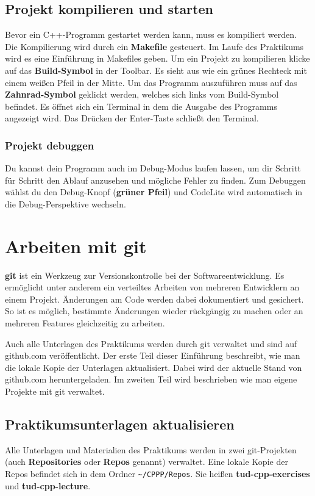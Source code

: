 \subsection{Projekt kompilieren und starten}
Bevor ein C++-Programm gestartet werden kann, muss es kompiliert werden.
Die Kompilierung wird durch ein \textbf{Makefile} gesteuert. Im Laufe des Praktikums wird es eine Einführung in Makefiles geben.
Um ein Projekt zu kompilieren klicke auf das \textbf{Build-Symbol} in der Toolbar. Es sieht aus wie ein grünes Rechteck mit einem weißen Pfeil in der Mitte.
Um das Programm auszuführen muss auf das \textbf{Zahnrad-Symbol} geklickt werden, welches sich links vom Build-Symbol befindet. Es öffnet sich ein Terminal in dem die Ausgabe des Programms angezeigt wird. Das Drücken der Enter-Taste schließt den Terminal.


\subsubsection{Projekt debuggen}
Du kannst dein Programm auch im Debug-Modus laufen lassen, um dir Schritt für Schritt den Ablauf anzusehen und mögliche Fehler zu finden.
Zum Debuggen wählst du den Debug-Knopf (\textbf{grüner Pfeil}) und CodeLite wird automatisch in die Debug-Perspektive wechseln. 

\section{Arbeiten mit git}

\textbf{git} ist ein Werkzeug zur Versionskontrolle bei der Softwareentwicklung. Es ermöglicht unter anderem ein verteiltes Arbeiten von mehreren Entwicklern an einem Projekt. Änderungen am Code werden dabei dokumentiert und gesichert. So ist es möglich, bestimmte Änderungen wieder rückgängig zu machen oder an mehreren Features gleichzeitig zu arbeiten.

Auch alle Unterlagen des Praktikums werden durch git verwaltet und sind auf github.com veröffentlicht. Der erste Teil dieser Einführung beschreibt, wie man die lokale Kopie der Unterlagen aktualisiert. Dabei wird der aktuelle Stand von github.com heruntergeladen. Im zweiten Teil wird beschrieben wie man eigene Projekte mit git verwaltet.

\subsection{Praktikumsunterlagen aktualisieren}
Alle Unterlagen und Materialien des Praktikums werden in zwei git-Projekten (auch \textbf{Repositories} oder \textbf{Repos} genannt) verwaltet. Eine lokale Kopie der Repos befindet sich in dem Ordner \texttt{\textasciitilde/CPPP/Repos}. Sie heißen \textbf{tud-cpp-exercises} und \textbf{tud-cpp-lecture}.

